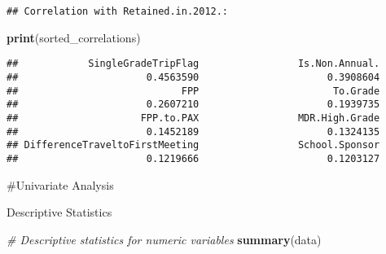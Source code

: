 \documentclass[
]{article}
\newenvironment{Shaded}{\begin{snugshade}}{\end{snugshade}}
\newcommand{\CommentTok}[1]{\textcolor[rgb]{0.56,0.35,0.01}{\textit{#1}}}
\newcommand{\FunctionTok}[1]{\textcolor[rgb]{0.13,0.29,0.53}{\textbf{#1}}}
\newcommand{\NormalTok}[1]{#1}
\begin{document}
\begin{verbatim}
## Correlation with Retained.in.2012.:
\end{verbatim}

\begin{Shaded}
\begin{Highlighting}[]
\FunctionTok{print}\NormalTok{(sorted\_correlations)}
\end{Highlighting}
\end{Shaded}

\begin{verbatim}
##            SingleGradeTripFlag                 Is.Non.Annual. 
##                      0.4563590                      0.3908604 
##                            FPP                       To.Grade 
##                      0.2607210                      0.1939735 
##                     FPP.to.PAX                 MDR.High.Grade 
##                      0.1452189                      0.1324135 
## DifferenceTraveltoFirstMeeting                 School.Sponsor 
##                      0.1219666                      0.1203127
\end{verbatim}

\#Univariate Analysis

Descriptive Statistics

\begin{Shaded}
\begin{Highlighting}[]
\CommentTok{\# Descriptive statistics for numeric variables}
\FunctionTok{summary}\NormalTok{(data)}
\end{Highlighting}
\end{Shaded}
\end{document}
